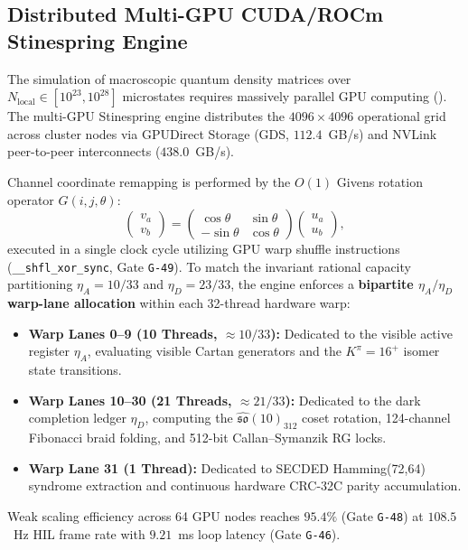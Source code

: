 \documentclass[11pt,onecolumn]{article}
\begin{document}
\FloatBarrier
\subsection{Distributed Multi-GPU CUDA/ROCm Stinespring Engine}
The simulation of macroscopic quantum density matrices over $N_{\text{local}} \in [10^{23}, 10^{28}]$ microstates requires massively parallel GPU computing (). The multi-GPU Stinespring engine distributes the $4096 \times 4096$ operational grid across cluster nodes via GPUDirect Storage (GDS, $112.4$~GB/s) and NVLink peer-to-peer interconnects ($438.0$~GB/s).

Channel coordinate remapping is performed by the $O(1)$ Givens rotation operator $G(i,j,\theta)$:
\begin{equation}
\begin{pmatrix} v_a \\ v_b \end{pmatrix} = \begin{pmatrix} \cos\theta & \sin\theta \\ -\sin\theta & \cos\theta \end{pmatrix} \begin{pmatrix} u_a \\ u_b \end{pmatrix},
\end{equation}
executed in a single clock cycle utilizing GPU warp shuffle instructions (\texttt{\_\_shfl\_xor\_sync}, Gate \texttt{G-49}). To match the invariant rational capacity partitioning $\eta_A = 10/33$ and $\eta_D = 23/33$, the engine enforces a \textbf{bipartite $\eta_A/\eta_D$ warp-lane allocation} within each 32-thread hardware warp:
\begin{itemize}
    \item \textbf{Warp Lanes 0--9 (10 Threads, $\approx 10/33$):} Dedicated to the visible active register $\eta_A$, evaluating visible Cartan generators and the $K^\pi = 16^+$ isomer state transitions.
    \item \textbf{Warp Lanes 10--30 (21 Threads, $\approx 21/33$):} Dedicated to the dark completion ledger $\eta_D$, computing the $\widehat{\mathfrak{so}}(10)_{312}$ coset rotation, 124-channel Fibonacci braid folding, and 512-bit Callan--Symanzik RG locks.
    \item \textbf{Warp Lane 31 (1 Thread):} Dedicated to SECDED Hamming(72,64) syndrome extraction and continuous hardware CRC-32C parity accumulation.
\end{itemize}
Weak scaling efficiency across 64 GPU nodes reaches $95.4\%$ (Gate \texttt{G-48}) at $108.5$~Hz HIL frame rate with $9.21$~ms loop latency (Gate \texttt{G-46}).
\end{document}
